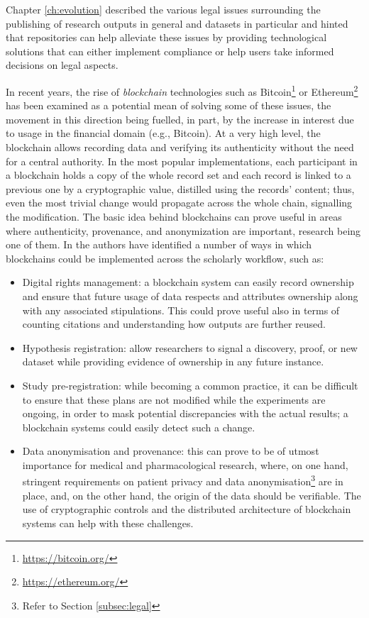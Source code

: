 Chapter \ref{ch:evolution} described the various legal issues surrounding the publishing of research outputs in general and datasets in particular and hinted that repositories can help alleviate these issues by providing technological solutions that can either implement compliance or help users take informed decisions on legal aspects.

In recent years, the rise of \emph{blockchain} technologies such as Bitcoin\footnote{\url{https://bitcoin.org/}} or Ethereum\footnote{\url{https://ethereum.org/}}  has been examined as a potential mean of solving some of these issues, the movement in this direction being fuelled, in part, by the increase in interest due to usage in the financial domain (e.g., Bitcoin). At a very high level, the blockchain allows recording data and verifying its authenticity without the need for a central authority. In the most popular implementations, each participant in a blockchain holds a copy of the whole record set and each record is linked to a previous one by a cryptographic value, distilled using the records' content; thus, even the most trivial change would propagate across the whole chain, signalling the modification. The basic idea behind blockchains can prove useful in areas where authenticity, provenance, and anonymization are important, research being one of them. In \cite{dsbc} the authors have identified a number of ways in which blockchains could be implemented across the scholarly workflow, such as:

\begin{itemize}
    \item Digital rights management: a blockchain system can easily record ownership and ensure that future usage of data respects and attributes  ownership along with any associated stipulations. This could prove useful also in terms of counting citations and understanding how outputs are further reused.
    \item Hypothesis registration: allow researchers to signal a discovery, proof, or new dataset while providing evidence of ownership in any future instance.
    \item Study pre-registration: while becoming a common practice, it can be difficult to ensure that these plans are not modified while the experiments are ongoing, in order to mask potential discrepancies with the actual results; a blockchain systems could easily detect such a change.
    \item Data anonymisation and provenance: this can prove to be of utmost importance for medical and pharmacological research, where, on one hand, stringent requirements on patient privacy and data anonymisation\footnote{Refer to Section \ref{subsec:legal}} are in place, and, on the other hand, the origin of the data should be verifiable. The use of cryptographic controls and the distributed architecture of blockchain systems can help with these challenges.
\end{itemize}

